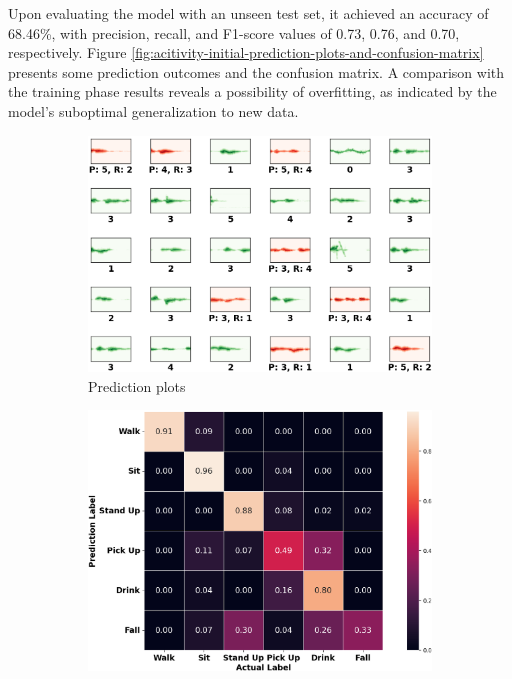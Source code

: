 \documentclass{l4proj}
\begin{document}
Upon evaluating the model with an unseen test set, it achieved an accuracy of 68.46\%, with precision, recall, and F1-score values of 0.73, 0.76, and 0.70, respectively. Figure \ref{fig:acitivity-initial-prediction-plots-and-confusion-matrix} presents some prediction outcomes and the confusion matrix. A comparison with the training phase results reveals a possibility of overfitting, as indicated by the model's suboptimal generalization to new data.
\begin{figure}[h]
   \centering
   \begin{subfigure}{0.4\textwidth}
        \includegraphics[width=\textwidth]{images/activity-initial-test-prediction-plots.png}
        \caption{Prediction plots}
        \label{fig:activity-initial-test-prediction-plots}
    \end{subfigure}
    \qquad
    \begin{subfigure}{0.4\textwidth}
        \includegraphics[width=\textwidth]{images/activity-initial-test-confusion-matrix.png}

\end{subfigure}
\end{figure}
\end{document}
